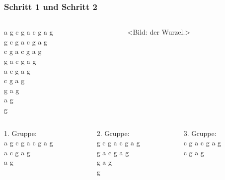 \documentclass{beamer}
\begin{document}
\begin{frame}[t]
\frametitle{Schritt 1 und Schritt 2}

\begin{columns}

    \begin{column}[t]{0.47\textwidth}
        a g c g a c g a g   \\
        g c g a c g a g     \\
        c g a c g a g       \\
        g a c g a g         \\
        a c g a g           \\
        c g a g             \\
        g a g               \\
        a g                 \\
        g                   \\
    \end{column}

    \begin{column}[t]{0.47\textwidth}
        <Bild: der Wurzel.>
    \end{column}

\end{columns}

\medskip

\begin{columns}

    \begin{column}[t]{0.3\textwidth}
        1. Gruppe:          \\
        a g c g a c g a g   \\
        a c g a g           \\
        a g                 \\
    \end{column}

    \begin{column}[t]{0.3\textwidth}
        2. Gruppe:      \\
        g c g a c g a g \\
        g a c g a g     \\
        g a g           \\
        g               \\
    \end{column}

    \begin{column}[t]{0.3\textwidth}
        3. Gruppe:      \\
        c g a c g a g   \\
        c g a g         \\
    \end{column}

\end{columns}

\end{frame}
\end{document}
